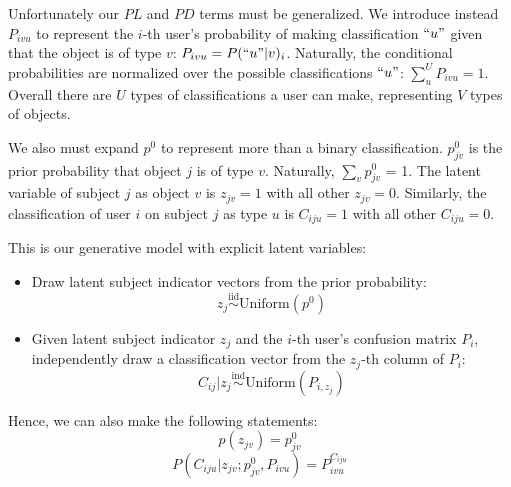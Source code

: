 \documentclass[useAMS,usenatbib,a4paper]{mn2e}
\begin{document}
Unfortunately our $PL$ and $PD$ terms must be
generalized. We introduce instead $P_{ivu}$ to represent the $i$-th user's
probability of making classification $``u"$ given that the object is of type
$v$: $P_{ivu} = P(``u" | v)_i$. Naturally, the conditional probabilities are
normalized over the possible classifications $``u"$: $\sum_u^U P_{ivu} = 1$. Overall there are $U$ types of
classifications a user can make, representing $V$ types of objects.

We also must expand $p^0$ to represent more than a binary classification.
$p_{jv}^0$ is the prior probability that object $j$ is of type $v$. Naturally,
$\sum_v p_{jv}^0$ = 1.
The latent variable of subject $j$ as object $v$ is $z_{jv} = 1$ with all
other $z_{jv} = 0$. Similarly, the classification of user $i$ on subject $j$
as type $u$ is $C_{iju} = 1$ with all other $C_{iju} = 0$.

This is our generative model with explicit latent variables:
\begin{itemize}
  \item{Draw latent subject indicator vectors from the prior probability: $$z_{j}
    \overset{\text{iid}}{\sim} \text{Uniform}\left(p^0\right)$$}
  \item{Given latent subject indicator $z_{j}$ and the $i$-th user's confusion
    matrix $P_i$, independently draw a classification vector from the $z_j$-th column
  of $P_i$: $$C_{ij} | z_{j} \overset{\text{ind}}{\sim}
\text{Uniform}\left(P_{i,z_j}\right)$$}
\end{itemize}
Hence, we can also make the following statements:
\begin{equation}
  p(z_{jv}) = p^0_{jv}
\end{equation}
\begin{equation}
  \label{eq:PCiju}
  P(C_{iju} | z_{jv}; p^0_{jv}, P_{ivu}) = P_{ivu}^{C_{iju}}
\end{equation}
\end{document}

